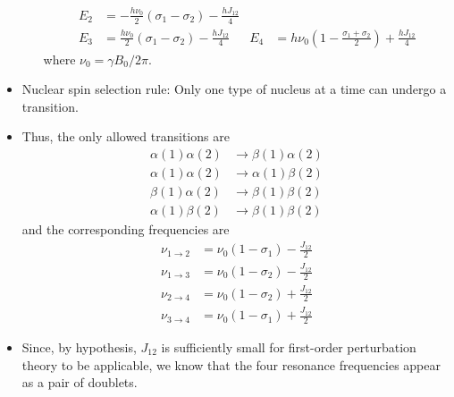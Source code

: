 \documentclass[../notes.tex]{subfiles}
\begin{document}
\begin{itemize}
\begin{itemize}
\begin{align*}
                E_2 &= -\frac{h\nu_0}{2}(\sigma_1-\sigma_2)-\frac{hJ_{12}}{4}\\
            E_3 &= \frac{h\nu_0}{2}(\sigma_1-\sigma_2)-\frac{hJ_{12}}{4}&
                E_4 &= h\nu_0\left( 1-\frac{\sigma_1+\sigma_2}{2} \right)+\frac{hJ_{12}}{4}
        \end{align*}
        where $\nu_0=\gamma B_0/2\pi$.
    \end{itemize}
    \item Nuclear spin selection rule: Only one type of nucleus at a time can undergo a transition.
    \item Thus, the only allowed transitions are
    \begin{align*}
        \alpha(1)\alpha(2) &\longrightarrow \beta(1)\alpha(2)\tag{$\psi_1\to\psi_2$}\\
        \alpha(1)\alpha(2) &\longrightarrow \alpha(1)\beta(2)\tag{$\psi_1\to\psi_3$}\\
        \beta(1)\alpha(2) &\longrightarrow \beta(1)\beta(2)\tag{$\psi_2\to\psi_4$}\\
        \alpha(1)\beta(2) &\longrightarrow \beta(1)\beta(2)\tag{$\psi_3\to\psi_4$}
    \end{align*}
    and the corresponding frequencies are
    \begin{align*}
        \nu_{1\to 2} &= \nu_0(1-\sigma_1)-\frac{J_{12}}{2}\\
        \nu_{1\to 3} &= \nu_0(1-\sigma_2)-\frac{J_{12}}{2}\\
        \nu_{2\to 4} &= \nu_0(1-\sigma_2)+\frac{J_{12}}{2}\\
        \nu_{3\to 4} &= \nu_0(1-\sigma_1)+\frac{J_{12}}{2}
    \end{align*}
    \item Since, by hypothesis, $J_{12}$ is sufficiently small for first-order perturbation theory to be applicable, we know that the four resonance frequencies appear as a pair of doublets.
    \begin{figure}[h!]
        \centering
        \footnotesize
\end{figure}
\end{itemize}
\end{document}
